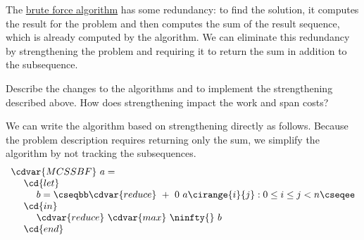 \begin{gram}[Strengthening]
The \href{alg:mcss::bf-alg::mcss}{brute force algorithm} 
%
has some redundancy: to find the solution, it computes the result for
the \MCS{} problem and then computes the sum of the result sequence,
which is already computed by the \MCS{} algorithm.
%
We can eliminate this redundancy by strengthening the \MCS{} problem
and requiring it to return the sum in addition to the subsequence.
%
\end{gram}

\begin{exercise}
Describe the changes to the algorithms 
%
 and 
%
to implement the strengthening described above.
%
How does strengthening impact the work and span costs?
\end{exercise}


\begin{algorithm}
\label{alg:mcss::bf-alg::mcss-strong}

We can write the algorithm based on strengthening directly as follows.
%
Because the problem description requires returning only the sum, we
simplify the algorithm by not tracking the subsequences.
%
\[
\begin{array}{l}
\cdvar{MCSSBF}~a =
\\
~~~~\cd{let} 
\\
~~~~~~~~b = \cseqbb \cdvar{reduce}~+~0~a\cirange{i}{j}  : 0  \le i \le j < n \cseqee
\\
~~~~\cd{in}
\\
~~~~~~~~\cdvar{reduce}~\cdvar{max}~\ninfty{}~b
\\
~~~~\cd{end}
\end{array}
\]
\end{algorithm}
%

